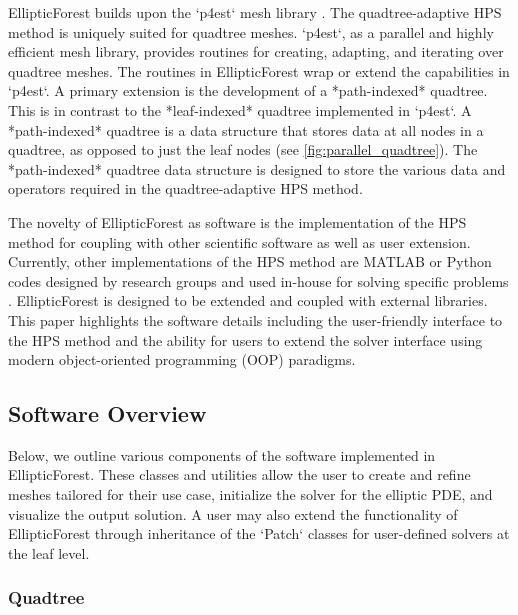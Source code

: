 EllipticForest builds upon the `p4est` mesh library \citep{burstedde2011p4est}. The quadtree-adaptive HPS method is uniquely suited for quadtree meshes. `p4est`, as a parallel and highly efficient mesh library, provides routines for creating, adapting, and iterating over quadtree meshes. The routines in EllipticForest wrap or extend the capabilities in `p4est`. A primary extension is the development of a *path-indexed* quadtree. This is in contrast to the *leaf-indexed* quadtree implemented in `p4est`. A *path-indexed* quadtree is a data structure that stores data at all nodes in a quadtree, as opposed to just the leaf nodes (see \autoref{fig:parallel_quadtree}). The *path-indexed* quadtree data structure is designed to store the various data and operators required in the quadtree-adaptive HPS method.

The novelty of EllipticForest as software is the implementation of the HPS method for coupling with other scientific software as well as user extension. Currently, other implementations of the HPS method are MATLAB or Python codes designed by research groups and used in-house for solving specific problems \citep{ultraSEM, HPS_Demos, Streamer_HPS}. EllipticForest is designed to be extended and coupled with external libraries. This paper highlights the software details including the user-friendly interface to the HPS method and the ability for users to extend the solver interface using modern object-oriented programming (OOP) paradigms.

\subsection{Software Overview}

Below, we outline various components of the software implemented in EllipticForest. These classes and utilities allow the user to create and refine meshes tailored for their use case, initialize the solver for the elliptic PDE, and visualize the output solution. A user may also extend the functionality of EllipticForest through inheritance of the `Patch` classes for user-defined solvers at the leaf level.

\subsubsection{Quadtree}

